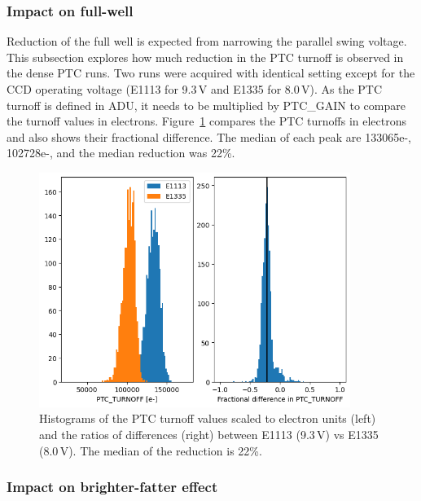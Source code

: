 


\subsubsection{Impact on full-well}\label{impact-on-full-well}

Reduction of the full well is expected from narrowing the parallel swing
voltage. This subsection explores how much reduction in the PTC turnoff
is observed in the dense PTC runs. Two runs were acquired with identical
setting except for the CCD operating voltage (E1113 for 9.3\,V and E1335
for 8.0\,V). As the PTC turnoff is defined in ADU, it needs to be
multiplied by PTC\_GAIN to compare the turnoff values in electrons.
Figure~\ref{fig:ptc-turnoff} compares the PTC turnoffs in electrons and also shows their
fractional difference. The median of each peak are 133065e-, 102728e-, and the median reduction was 22\%.

\begin{figure}
\begin{centering}
\includegraphics[width=0.9\textwidth]{figures/PtcTurnoffRatio.png}
\end{centering}
\caption{Histograms of the PTC turnoff values scaled to electron units (left) and the ratios of
differences (right) between E1113 (9.3\,V) vs E1335 (8.0\,V). The median of
the reduction is 22\%.}
\label{fig:ptc-turnoff}
\end{figure}



\subsubsection{Impact on brighter-fatter effect}\label{impact-on-brighter-fatter-effect}

